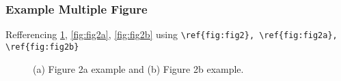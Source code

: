 \documentclass{beamer}
\begin{document}
\begin{frame}[fragile]
  \frametitle{Example Multiple Figure}

  Refferencing \ref{fig:fig2}, \ref{fig:fig2a}, \ref{fig:fig2b} using \verb|\ref{fig:fig2}, \ref{fig:fig2a}, \ref{fig:fig2b}|

\begin{figure}[t]
  \centering
      \hspace*{-1.2em}  %
  \caption{(a) Figure 2a example and (b) Figure 2b example.}
  \label{fig:fig2}
\end{figure}

\end{frame}

  
  
  
  
  
  
\end{document}
